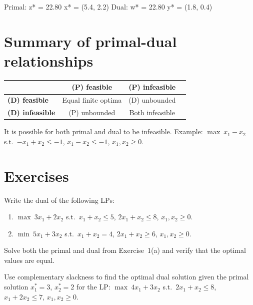 \begin{codeoutput}
Primal: z* = 22.80
  x* = (5.4, 2.2)
Dual: w* = 22.80
  y* = (1.8, 0.4)
\end{codeoutput}

\section{Summary of primal-dual relationships}

\begin{center}
\renewcommand{\arraystretch}{1.3}
\begin{tabular}{lccc}
  \toprule
  & \textbf{(P) feasible} & \textbf{(P) infeasible} \\
  \midrule
  \textbf{(D) feasible} & Equal finite optima & (D) unbounded \\
  \textbf{(D) infeasible} & (P) unbounded & Both infeasible \\
  \bottomrule
\end{tabular}
\end{center}

\begin{remark}
It is possible for both primal and dual to be infeasible.  Example:
$\max\ x_1 - x_2$ s.t.\ $-x_1 + x_2 \le -1$, $x_1 - x_2 \le -1$,
$x_1, x_2 \ge 0$.
\end{remark}

\section{Exercises}

\begin{exercise}
Write the dual of the following LPs:
\begin{enumerate}
  \item $\max\ 3x_1 + 2x_2$ s.t.\ $x_1 + x_2 \le 5$,
        $2x_1 + x_2 \le 8$, $x_1, x_2 \ge 0$.
  \item $\min\ 5x_1 + 3x_2$ s.t.\ $x_1 + x_2 = 4$,
        $2x_1 + x_2 \ge 6$, $x_1, x_2 \ge 0$.
\end{enumerate}
\end{exercise}

\begin{exercise}
Solve both the primal and dual from Exercise~1(a) and verify that the optimal
values are equal.
\end{exercise}

\begin{exercise}
Use complementary slackness to find the optimal dual solution given the
primal solution $x_1^* = 3$, $x_2^* = 2$ for the LP:
$\max\ 4x_1 + 3x_2$ s.t.\ $2x_1 + x_2 \le 8$, $x_1 + 2x_2 \le 7$,
$x_1, x_2 \ge 0$.
\end{exercise}


